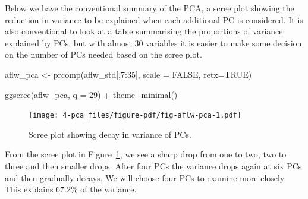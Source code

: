 \documentclass[
  letterpaper,
]{krantz}
\newenvironment{Shaded}{\begin{snugshade}}{\end{snugshade}}
\newcommand{\AttributeTok}[1]{\textcolor[rgb]{0.40,0.45,0.13}{#1}}
\newcommand{\ConstantTok}[1]{\textcolor[rgb]{0.56,0.35,0.01}{#1}}
\newcommand{\DecValTok}[1]{\textcolor[rgb]{0.68,0.00,0.00}{#1}}
\newcommand{\FunctionTok}[1]{\textcolor[rgb]{0.28,0.35,0.67}{#1}}
\newcommand{\NormalTok}[1]{\textcolor[rgb]{0.00,0.23,0.31}{#1}}
\newcommand{\OtherTok}[1]{\textcolor[rgb]{0.00,0.23,0.31}{#1}}
\newcommand{\SpecialCharTok}[1]{\textcolor[rgb]{0.37,0.37,0.37}{#1}}
\newcommand{\StringTok}[1]{\textcolor[rgb]{0.13,0.47,0.30}{#1}}
\begin{document}
Below we have the conventional summary of the PCA, a scree plot showing
the reduction in variance to be explained when each additional PC is
considered. It is also conventional to look at a table summarising the
proportions of variance explained by PCs, but with almost 30 variables
it is easier to make some decision on the number of PCs needed based on
the scree plot.

\begin{Shaded}
\begin{Highlighting}[]
\NormalTok{aflw\_pca }\OtherTok{\textless{}{-}} \FunctionTok{prcomp}\NormalTok{(aflw\_std[,}\DecValTok{7}\SpecialCharTok{:}\DecValTok{35}\NormalTok{], }
               \AttributeTok{scale =} \ConstantTok{FALSE}\NormalTok{, }
               \AttributeTok{retx=}\ConstantTok{TRUE}\NormalTok{)}

\FunctionTok{ggscree}\NormalTok{(aflw\_pca, }\AttributeTok{q =} \DecValTok{29}\NormalTok{) }\SpecialCharTok{+} \FunctionTok{theme\_minimal}\NormalTok{()}
\end{Highlighting}
\end{Shaded}

\begin{figure}[H]

{\centering \texttt{[image: 4-pca\_files/figure-pdf/fig-aflw-pca-1.pdf]}

}

\caption{\label{fig-aflw-pca}Scree plot showing decay in variance of
PCs.}

\end{figure}

From the scree plot in Figure~\ref{fig-aflw-pca}, we see a sharp drop
from one to two, two to three and then smaller drops. After four PCs the
variance drops again at six PCs and then gradually decays. We will
choose four PCs to examine more closely. This explains 67.2\% of the
variance.

\begin{Shaded}
\end{Shaded}
\end{document}
